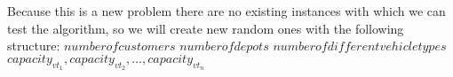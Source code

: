 \begin{}
	Because this is a new problem there are no existing instances with which we can test the algorithm, so we will create new random ones with the following structure:
	$number of customers$ $number of depots$ $number of different vehicle types$\\
	$capacity_{vt_1}, capacity_{vt_2}, ..., capacity_{vt_n}$
\end{}
